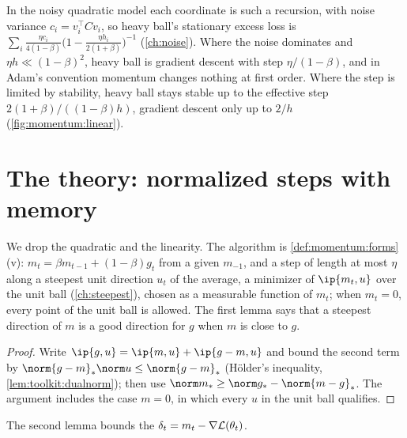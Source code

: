 \begin{refsection}
In the noisy quadratic model each coordinate is such a recursion, with noise variance $c_i=v_i^\top Cv_i$, so heavy ball's stationary excess loss is $\sum_i\frac{\eta c_i}{4(1-\beta)}\bigl(1-\frac{\eta h_i}{2(1+\beta)}\bigr)^{-1}$ (\cref{ch:noise}). Where the noise dominates and $\eta h\ll(1-\beta)^2$, heavy ball is gradient descent with step $\eta/(1-\beta)$, and in Adam's convention momentum changes nothing at first order. Where the step is limited by stability, heavy ball stays stable up to the effective step $2(1+\beta)/((1-\beta)h)$, gradient descent only up to $2/h$ (\cref{fig:momentum:linear}).

\section{The theory: normalized steps with memory}\label{sec:momentum:normalized}

We drop the quadratic and the linearity. The algorithm is \cref{def:momentum:forms}(v): $m_t=\beta m_{t-1}+(1-\beta)g_t$ from a given $m_{-1}$, and a step of length at most $\eta$ along a steepest unit direction $u_t$ of the average, a minimizer of $\ip{m_t,u}$ over the unit ball (\cref{ch:steepest}), chosen as a measurable function of $m_t$; when $m_t=0$, every point of the unit ball is allowed. The first lemma says that a steepest direction of $m$ is a good direction for $g$ when $m$ is close to $g$.


\begin{proof}
Write $\ip{g,u}=\ip{m,u}+\ip{g-m,u}$ and bound the second term by $\norm{g-m}_*\norm u\le\norm{g-m}_*$ (Hölder's inequality, \cref{lem:toolkit:dualnorm}); then use $\norm m_*\ge\norm g_*-\norm{m-g}_*$. The argument includes the case $m=0$, in which every $u$ in the unit ball qualifies.
\end{proof}

The second lemma bounds the  $\delta_t=m_t-\nabla\mathcal{L}(\theta_t)$.



\end{refsection}
